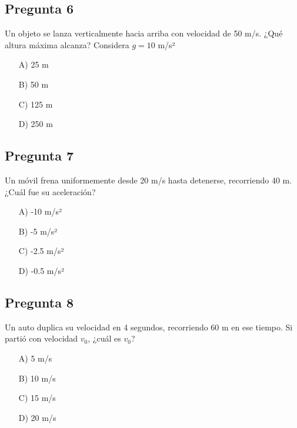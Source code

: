 \begin{preguntabox}
\subsection{Pregunta 6}
Un objeto se lanza verticalmente hacia arriba con velocidad de 50 m/s. ¿Qué altura máxima alcanza? Considera $g = 10$ m/s²

\begin{enumerate}
    \item[A)] 25 m
    \item[B)] 50 m
    \item[C)] 125 m
    \item[D)] 250 m
\end{enumerate}
\end{preguntabox}

\begin{preguntabox}
\subsection{Pregunta 7}
Un móvil frena uniformemente desde 20 m/s hasta detenerse, recorriendo 40 m. ¿Cuál fue su aceleración?

\begin{enumerate}
    \item[A)] -10 m/s²
    \item[B)] -5 m/s²
    \item[C)] -2.5 m/s²
    \item[D)] -0.5 m/s²
\end{enumerate}
\end{preguntabox}

\newpage
\begin{preguntabox}
\subsection{Pregunta 8}
Un auto duplica su velocidad en 4 segundos, recorriendo 60 m en ese tiempo. Si partió con velocidad $v_0$, ¿cuál es $v_0$?

\begin{enumerate}
    \item[A)] 5 m/s
    \item[B)] 10 m/s
    \item[C)] 15 m/s
    \item[D)] 20 m/s
\end{enumerate}
\end{preguntabox}

